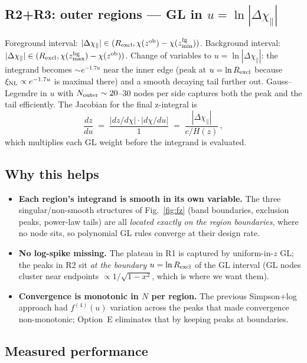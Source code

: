 \documentclass[11pt]{article}
\newcommand{\zob}{z^{\rm ob}}
\newcommand{\xinl}{\xi_{\rm NL}}
\begin{document}
\subsection*{R2+R3: outer regions --- GL in
\(u=\ln|\Delta\chi_\parallel|\)}
Foreground interval:
\(|\Delta\chi_\parallel|\in(R_{\rm excl},\chi(\zob)-\chi(z^{\rm fg}_{\min}))\).
Background interval:
\(|\Delta\chi_\parallel|\in(R_{\rm excl},\chi(z^{\rm bg}_{\max})-\chi(\zob))\).
Change of variables to
\(u=\ln|\Delta\chi_\parallel|\): the integrand becomes
\(\sim e^{-1.7 u}\) near the inner edge (peak at
\(u=\ln R_{\rm excl}\) because
\(\xinl\propto e^{-1.7u}\) is maximal there) and a smooth
decaying tail further out. Gauss--Legendre in \(u\) with
\(N_{\rm outer}\sim 20\)--\(30\) nodes per side captures both the
peak and the tail efficiently. The Jacobian for the final z-integral is
\begin{equation}
\frac{dz}{du}\;=\;\frac{|dz/d\chi|\cdot|d\chi/du|}{1}
             \;=\;\frac{|\Delta\chi_\parallel|}{c/H(z)}
\,,
\end{equation}
which multiplies each GL weight before the integrand is evaluated.

\subsection*{Why this helps}
\begin{itemize}
  \item \textbf{Each region's integrand is smooth in its own
        variable.} The three singular/non-smooth structures of
        Fig.~\ref{fig:fz} (band boundaries, exclusion peaks,
        power-law tails) are all \emph{located exactly on the
        region boundaries}, where no node sits, so polynomial GL
        rules converge at their design rate.
  \item \textbf{No log-spike missing.} The plateau in R1 is
        captured by uniform-in-\(z\) GL; the peaks in R2 sit
        \emph{at the boundary} \(u=\ln R_{\rm excl}\) of the GL
        interval (GL nodes cluster near endpoints
        \(\propto 1/\sqrt{1-x^2}\), which is where we want them).
  \item \textbf{Convergence is monotonic in \(N\) per region.} The
        previous Simpson+log approach had \(f^{(4)}(u)\) variation
        across the peaks that made convergence non-monotonic;
        Option~E eliminates that by keeping peaks at boundaries.
\end{itemize}

\subsection*{Measured performance}
\end{document}
